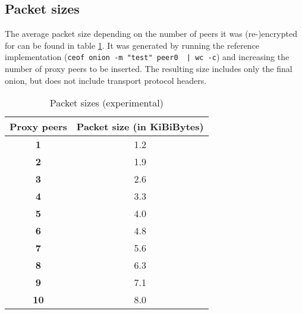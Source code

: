 \subsection{Packet sizes}
The average packet size depending on the number of peers it was
(re-)encrypted for can be found in table \ref{pkgsizes}.
It was generated by running the reference implementation
(\verb=ceof onion -m "test" peer0  | wc -c=)
and increasing the number of proxy peers to be inserted.
The resulting size includes only the final onion,
but does not include transport protocol headers.
\begin{longtable}{|c|c|}
\caption{Packet sizes (experimental)}
\label{pkgsizes}\\
\hline
\textbf{Proxy peers} & \textbf{Packet size (in KiBiBytes)}\\
\hline
\textbf{1} & 1.2\\
\hline
\textbf{2} & 1.9\\
\hline
\textbf{3} & 2.6\\
\hline
\textbf{4} & 3.3\\
\hline
\textbf{5} & 4.0\\
\hline
\textbf{6} & 4.8\\
\hline
\textbf{7} & 5.6\\
\hline
\textbf{8} & 6.3\\
\hline
\textbf{9} & 7.1\\
\hline
\textbf{10} & 8.0\\
\hline
\end{longtable}



